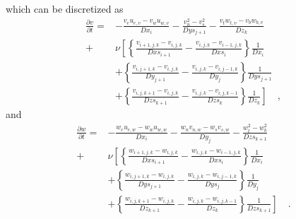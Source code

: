 \documentclass[12pt,a4paper,fleqn]{article}
\begin{document}
which can be discretized as
\begin{align}\label{eq:3D-discretized_convective-diffusive-v}
\frac{\partial v}{\partial t} =
{}& - \frac{v_e u_{e,v} - v_w u_{w,v}}{Dx_i}
- \frac{v_n^2 - v_s^2}{Dys_{j+1}}
- \frac{v_t w_{t,v} - v_b w_{b,v}}{Dz_k}\nonumber\\
+ & \nu\left[
\left\{
\frac{v_{i+1,j,k}-v_{i,j,k}}{Dxs_{i+1}}
- \frac{v_{i,j,k}-v_{i-1,j,k}}{Dxs_i}
\right\}
\frac{1}{Dx_i}
\right.\nonumber\\
& + \left\{
\frac{v_{i,j+1,k}-v_{i,j,k}}{Dy_{j+1}}
- \frac{v_{i,j,k}-v_{i,j-1,k}}{Dy_j}
\right\}
\frac{1}{Dys_{j+1}}\nonumber\\
& \left. + \left\{
\frac{v_{i,j,k+1}-v_{i,j,k}}{Dzs_{k+1}}
- \frac{v_{i,j,k}-v_{i,j,k-1}}{Dzs_k}
\right\}
\frac{1}{Dz_k}
\right] \quad ,
\end{align}
and
\begin{align}\label{eq:3D-discretized_convective-diffusive-w}
\frac{\partial w}{\partial t} =
{}& - \frac{w_e u_{e,w} - w_w u_{w,w}}{Dx_i}
- \frac{w_n v_{n,w} - w_s v_{s,w}}{Dy_j}
- \frac{w_t^2 - w_b^2}{Dzs_{k+1}}\nonumber\\
+ & \nu\left[
\left\{
\frac{w_{i+1,j,k}-w_{i,j,k}}{Dxs_{i+1}}
- \frac{w_{i,j,k}-w_{i-1,j,k}}{Dxs_i}
\right\}
\frac{1}{Dx_i}
\right.\nonumber\\
& + \left\{
\frac{w_{i,j+1,k}-w_{i,j,k}}{Dys_{j+1}}
- \frac{w_{i,j,k}-w_{i,j-1,k}}{Dys_j}
\right\}
\frac{1}{Dy_j}\nonumber\\
& \left. + \left\{
\frac{w_{i,j,k+1}-w_{i,j,k}}{Dz_{k+1}}
- \frac{w_{i,j,k}-w_{i,j,k-1}}{Dz_k}
\right\}
\frac{1}{Dzs_{k+1}}
\right] \quad .
\end{align}

%
\end{document}
